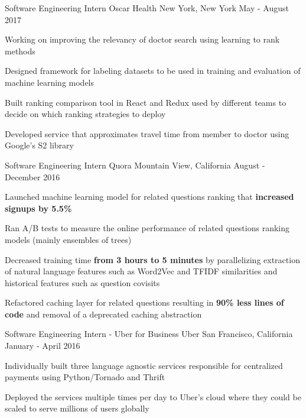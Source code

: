 \begin{cventries}
  \cventry
    {Software Engineering Intern}
    {Oscar Health}
    {New York, New York}
    {May - August 2017}
    {
      \begin{cvitems}
      \item Working on improving the relevancy of doctor search using learning to rank methods
      \item Designed framework for labeling datasets to be used in training and evaluation of machine learning models
      \item Built ranking comparison tool in React and Redux used by different teams to decide on which ranking strategies to deploy
      \item Developed service that approximates travel time from member to doctor using Google's S2 library
      \end{cvitems}
    }
  \cventry
    {Software Engineering Intern}
    {Quora}
    {Mountain View, California}
    {August - December 2016}
    {
      \begin{cvitems}
      \item Launched machine learning model for related questions ranking that \textbf{increased signups by 5.5\%}
      \item Ran A/B tests to measure the online performance of related questions ranking models (mainly ensembles of trees)
      \item Decreased training time \textbf{from 3 hours to 5 minutes} by parallelizing extraction of natural language features such as Word2Vec and TFIDF similarities and historical features such as question covisits
      \item Refactored caching layer for related questions resulting in \textbf{90\% less lines of code} and removal of a deprecated caching abstraction
      \end{cvitems}
    }
  \cventry
    {Software Engineering Intern - Uber for Business}
    {Uber}
    {San Francisco, California}
    {January - April 2016}
    {
      \begin{cvitems}
      \item Individually built three language agnostic services responsible for centralized payments using Python/Tornado and Thrift
      \item Deployed the services multiple times per day to Uber's cloud where they could be scaled to serve millions of users globally

\end{cvitems}}
\end{cventries}
